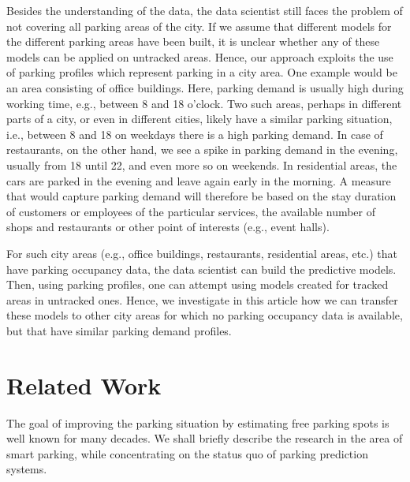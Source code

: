 Besides the understanding of the data, the data scientist still faces the problem of not covering all parking areas of the city. 
If we assume that different models for the different parking areas have been built, it is unclear whether any of these models can be applied on untracked areas. 
Hence, our approach exploits the use of parking profiles which represent parking in a city area. One example would be an area consisting of office buildings. Here, parking demand is usually high during working time, e.g., between 8 and 18 o'clock. Two such areas, perhaps in different parts of a city, or even in different cities, likely have a similar parking situation, i.e., between 8 and 18 on weekdays there is a high parking demand. In case of restaurants, on the other hand, we see a spike in parking demand in the evening, usually from 18 until 22, and even more so on weekends. In residential areas, the cars are parked in the evening and leave again early in the morning. A measure that would capture parking demand will therefore be based on the stay duration of customers or employees of the particular services, the available number of shops and restaurants or other point of interests (e.g., event halls). 

For such city areas (e.g., office buildings, restaurants, residential areas, etc.) that have parking occupancy data, the data scientist can build the predictive models. 
Then, using parking profiles, one can attempt using models created for tracked areas in untracked ones. 
Hence, we investigate in this article how we can transfer these models to other city areas for which no parking occupancy data is available, but that have similar parking demand profiles. 

\section{Related Work}
\label{sec:relwork}
The goal of improving the parking situation by estimating free parking spots is well known for many decades. 
We shall briefly describe the research in the area of smart parking, while concentrating on the status quo of parking prediction systems.



